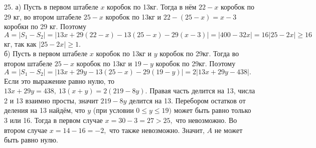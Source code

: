 25. а) Пусть в первом штабеле $x$ коробок по 13кг. Тогда в нём $22-x$ коробок по 29 кг, во втором штабеле $25-x$ коробок по 13кг и $22-(25-x)=x-3$ коробки по 29 кг.
Поэтому $A=|S_1-S_2|=|13x+29(22-x)-13(25-x)-29(x-3)|=|400-32x|=16|25-2x|\geqslant16$кг, так как $|25-2x|\geqslant1.$\\
б) Пусть в первом штабеле $x$ коробок по 13кг и $y$ коробок по 29кг. Тогда во втором штабеле $25-x$ коробок по 13кг и $19-y$ коробок по 29кг. Поэтому
$A=|S_1-S_2|=|13x+29y-13(25-x)-29(19-y)|=2|13x+29y-438|.$ Если это выражение равно нулю, то $13x+29y=438,\ 13(x+y)=2(219-8y).$ Правая часть делится на 13, числа 2 и 13 взаимно просты, значит $219-8y$ делится на 13. Перебором остатков от деления на 13 найдём, что $y$ (при условии $0\leqslant y\leqslant19)$ может быть равно только 3 или 16. Тогда в первом случае $x=30-3=27>25,$ что невозможно. Во втором случае $x=14-16=-2,$ что также невозможно. Значит, $A$ не может быть равно нулю.\\
